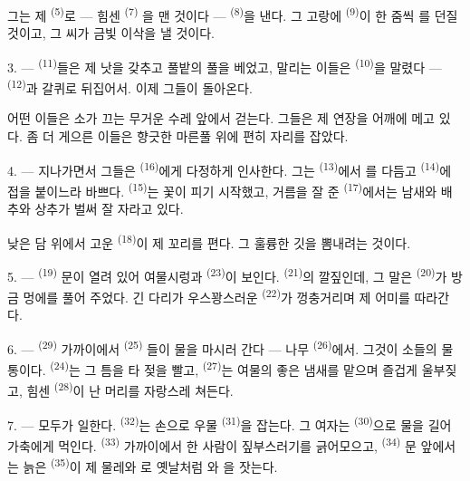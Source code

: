 그는 제  \textsuperscript{(5)}로 — 힘센  \textsuperscript{(7)}
을 맨 것이다 —  \textsuperscript{(8)}을 낸다. 그 고랑에 
\textsuperscript{(9)}이 한 줌씩 를 던질 것이고, 그 씨가 금빛 이삭을 낼 것이다.

3. ---  \textsuperscript{(11)}들은 제 낫을 갖추고 풀밭의 풀을 베었고,
말리는 이들은  \textsuperscript{(10)}을 말렸다 — 
\textsuperscript{(12)}과 갈퀴로 뒤집어서. 이제 그들이 돌아온다.

어떤 이들은 소가 끄는 무거운 수레 앞에서 걷는다. 그들은 제 연장을 어깨에 메고 있다. 좀
더 게으른 이들은 향긋한 마른풀 위에 편히 자리를 잡았다.

4. --- 지나가면서 그들은  \textsuperscript{(16)}에게 다정하게 인사한다.
그는  \textsuperscript{(13)}에서 를 다듬고 
\textsuperscript{(14)}에 접을 붙이느라 바쁘다.  \textsuperscript{(15)}는
꽃이 피기 시작했고, 거름을 잘 준  \textsuperscript{(17)}에서는 남새와
배추와 상추가 벌써 잘 자라고 있다.

낮은 담 위에서 고운  \textsuperscript{(18)}이 제 꼬리를 편다. 그 훌륭한
깃을 뽐내려는 것이다.

\VUsaut{3.0mm}

5. ---  \textsuperscript{(19)} 문이 열려 있어 여물시렁과 
\textsuperscript{(23)}이 보인다.  \textsuperscript{(21)}의 깔짚인데, 그 말은
 \textsuperscript{(20)}가 방금 멍에를 풀어 주었다. 긴 다리가 우스꽝스러운
 \textsuperscript{(22)}가 껑충거리며 제 어미를 따라간다.

6. ---  \textsuperscript{(29)} 가까이에서  \textsuperscript{(25)}
들이 물을 마시러 간다 — 나무  \textsuperscript{(26)}에서. 그것이 소들의
물통이다.  \textsuperscript{(24)}는 그 틈을 타 젖을 빨고, 
\textsuperscript{(27)}는 여물의 좋은 냄새를 맡으며 즐겁게 울부짖고, 힘센 
\textsuperscript{(28)}이 난 머리를 자랑스레 쳐든다.

7. --- 모두가 일한다.  \textsuperscript{(32)}는 손으로 우물
 \textsuperscript{(31)}을 잡는다. 그 여자는 
\textsuperscript{(30)}으로 물을 길어 가축에게 먹인다.  \textsuperscript{(33)}
가까이에서 한 사람이 짚부스러기를 긁어모으고,  \textsuperscript{(34)} 문
앞에서는 늙은  \textsuperscript{(35)}이 제 물레와 로
옛날처럼 와 을 잣는다.


